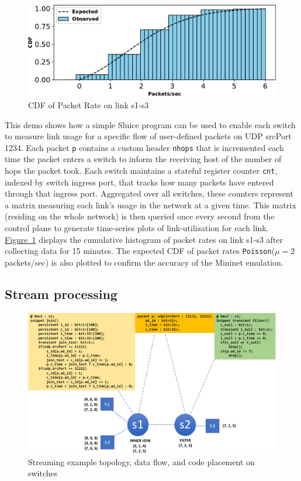 \documentclass[12pt, oneside]{article}
\newcommand{\irref}[2]{\hyperref[#2]{#1~\ref{#2}}}
\begin{document}
\begin{figure}
\centering
\includegraphics[width=160mm,scale=0.7]{figures/exp_obs_cdf}
\caption{CDF of Packet Rate on link s1-s3}\label{cdf}
\end{figure}

This demo shows how a simple Sluice program can be used to enable each switch
to measure link usage for a specific flow of user-defined packets on UDP
srcPort 1234. Each packet \texttt{p} contains a custom header \texttt{nhops}
that is incremented each time the packet enters a switch to inform the
receiving host of the number of hops the packet took. Each switch maintains a
stateful register counter \texttt{cnt}, indexed by switch ingress port, that
tracks how many packets have entered through that ingress port. Aggregated over
all switches, these counters represent a matrix measuring each link's
usage in the network at a given time. This matrix (residing on the whole
network) is then queried once every second from the control plane to generate
time-series plots of link-utilization for each link. \irref{Figure}{cdf} displays the cumulative
histogram of packet rates on link s1-s3 after collecting data for 15 minutes.
The expected CDF of packet rates \texttt{Poisson}($\mu = 2$
packets/sec) is also plotted to confirm the accuracy of the Mininet emulation.

\subsection{Stream processing}

\begin{figure}
\centering
\includegraphics[width=165mm]{figures/streaming_example}
\caption{Streaming example topology, data flow, and code placement on switches}\label{str}
\end{figure}
\end{document}
